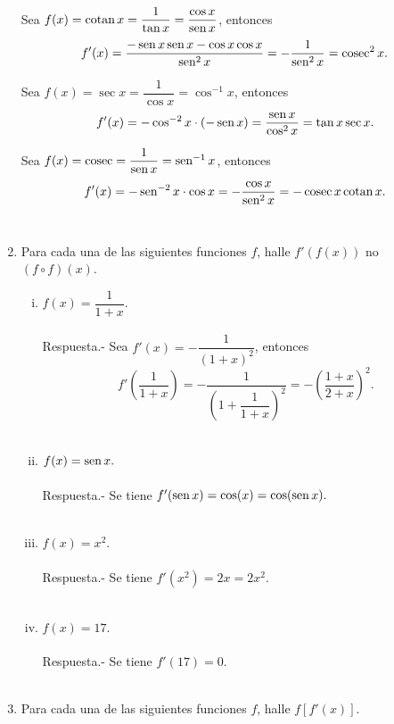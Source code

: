 \begin{enumerate}[\bfseries 1.]
	Sea $f(x)=\cotan x = \dfrac{1}{\tan x}=\dfrac{\cos x}{\sen x}$, entonces
	$$f'(x)=\dfrac{-\sen x\sen x - \cos x \cos x}{\sen^2 x}=-\dfrac{1}{\sen^2 x}=\cosec^2 x.$$

	Sea $f(x)=\sec x = \dfrac{1}{\cos x} = \cos^{-1}x$, entonces
	$$f'(x)=-\cos^{-2}x\cdot (-\sen x)=\dfrac{\sen x}{\cos^2 x}=\tan x \sec x.$$

	Sea $f(x)=\cosec = \dfrac{1}{\sen x} = \sen^{-1}x$, entonces
	$$f'(x)=-\sen^{-2}x\cdot \cos x = -\dfrac{\cos x}{\sen^2 x} = -\cosec x \cotan x.$$\\

    \item Para cada una de las siguientes funciones $f$, halle $f'(f(x))$ no $(f\circ f)(x)$.\\

	\begin{enumerate}[(i)]

	    \item $f(x)=\dfrac{1}{1+x}.$\\\\
		Respuesta.-\;  Sea $f'(x)=-\dfrac{1}{(1+x)^2}$, entonces
		$$f'\left(\dfrac{1}{1+x}\right)=-\dfrac{1}{\left(1+\dfrac{1}{1+x}\right)^2}=-\left(\dfrac{1+x}{2+x}\right)^2.$$\\

	    \item $f(x)=\sen x.$\\\\
		Respuesta.-\; Se tiene $f'(\sen x) = \cos(x) =\cos(\sen x).$\\\\

	    \item $f(x)=x^2$.\\\\
		Respuesta.-\; Se tiene $f'\left(x^2\right)=2x=2x^2.$\\\\

	    \item $f(x)=17.$\\\\
		Respuesta.-\; Se tiene $f'(17)=0.$\\\\

	\end{enumerate}

    \item Para cada una de las siguientes funciones $f$, halle $f\left[f'(x)\right]$.\\


\end{enumerate}
